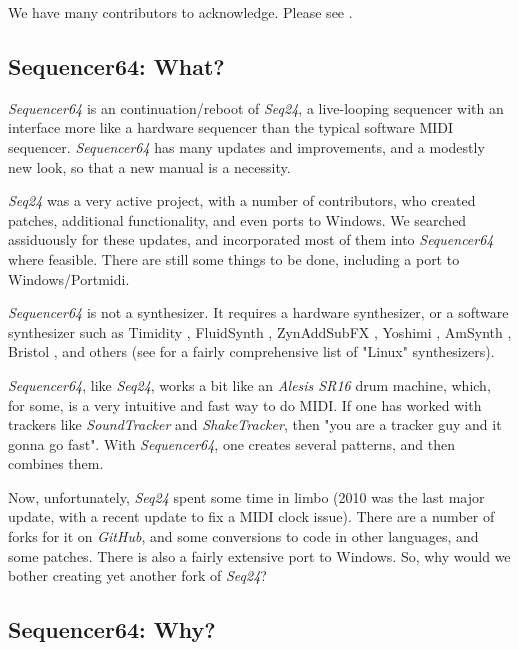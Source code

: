 \documentclass[
 11pt,
 twoside,
 a4paper,
 headinclude,
 footinclude,
 final                                 %
]{article}
\begin{document}
   We have many contributors to acknowledge.  Please see
   .

\subsection{Sequencer64: What?}
\label{subsec:what_is_sequencer64}

   \textsl{Sequencer64} is an continuation/reboot of \textsl{Seq24},
   a live-looping sequencer with an interface more like a hardware sequencer
   than the typical software MIDI sequencer.
   \textsl{Sequencer64} has many updates and improvements, and a modestly
   new look, so that a new manual is a necessity.

   \textsl{Seq24} was a very active project, with a
   number of contributors, who created patches, additional
   functionality, and even ports to Windows.
   We searched assiduously for these updates, and
   incorporated most of them into \textsl{Sequencer64} where feasible.
   There are still some things to be done, including a port to
   Windows/Portmidi.

   \textsl{Sequencer64} is not a synthesizer.  It requires a hardware
   synthesizer, or a software synthesizer such as Timidity \cite{timidity},
   FluidSynth \cite{fluidsynth}, ZynAddSubFX \cite{zynaddsubfx}, Yoshimi
   \cite{yoshimi} \cite{yoshimi2}, AmSynth \cite{amsynth}, Bristol
   \cite{bristol}, and others (see \cite{linuxsynths} for a fairly
   comprehensive list of "Linux" synthesizers).

   \textsl{Sequencer64}, like \textsl{Seq24},
   works a bit like an \textsl{Alesis SR16} drum machine,
   which, for some, is a very intuitive and fast way to do MIDI.
   If one has worked with trackers like \textsl{SoundTracker} and
   \textsl{ShakeTracker}, then "you are a tracker guy and it gonna go fast".
   With \textsl{Sequencer64}, one creates several patterns, and then
   combines them.

   Now, unfortunately, \textsl{Seq24} spent some time in limbo
   (2010 was the last major update, with a
   recent update to fix a MIDI clock issue).  There are a number of
   forks for it on \textsl{GitHub}, and some conversions
   to code in other languages, and some patches.
   There is also a fairly extensive port to Windows.
   So, why would we bother creating yet another fork of \textsl{Seq24}?

\subsection{Sequencer64: Why?}
\label{subsec:introduction_seq64_vs_others}
\end{document}
